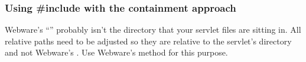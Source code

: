 \subsubsection{Using \#include with the containment approach}
\label{webware.containment.includes}

Webware's ``'' probably isn't the directory that
your servlet files are sitting in.  All relative paths need to be adjusted so
they are relative to the servlet's directory and not Webware's .  Use Webware's  method for
this purpose.

%
%


